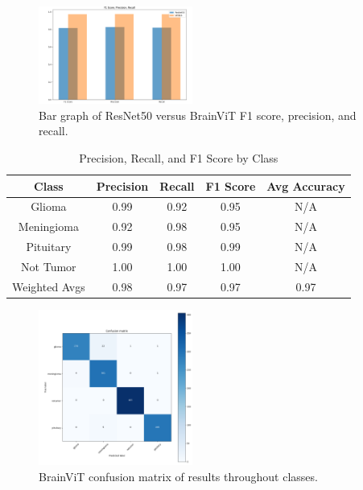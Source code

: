 \documentclass[conference]{IEEEtran}
\begin{document}
\begin{figure}[htbp]
    \centering
    \includegraphics[width=0.45\textwidth]{resnet versus brainvit2.PNG}
    \caption{Bar graph of ResNet50 versus BrainViT F1 score, precision, and recall.}
    \label{fig:4}
\end{figure}

\begin{table}[htbp]
    \centering
    \caption{Precision, Recall, and F1 Score by Class}
    \label{tab:example_with_headers}
    \begin{tabular}{|c|c|c|c|c|}
        \hline
        \textbf{Class} & \textbf{Precision} & \textbf{Recall} & \textbf{F1 Score} & \textbf{Avg Accuracy}\\ 
        \hline
        Glioma & 0.99 & 0.92 & 0.95 & N/A\\ 
        Meningioma & 0.92 & 0.98 & 0.95 & N/A \\ 
        Pituitary & 0.99 & 0.98 & 0.99 & N/A\\
        Not Tumor & 1.00 & 1.00 & 1.00 & N/A\\
        Weighted Avgs & 0.98 & 0.97 & 0.97 & 0.97 \\
        \hline
    \end{tabular}
\end{table}

\begin{figure}[h]
    \centering
    \includegraphics[width=0.45\textwidth]{results cm.PNG}
    \caption{BrainViT confusion matrix of results throughout classes.}
    \label{fig:cm}
\end{figure}
\end{document}
